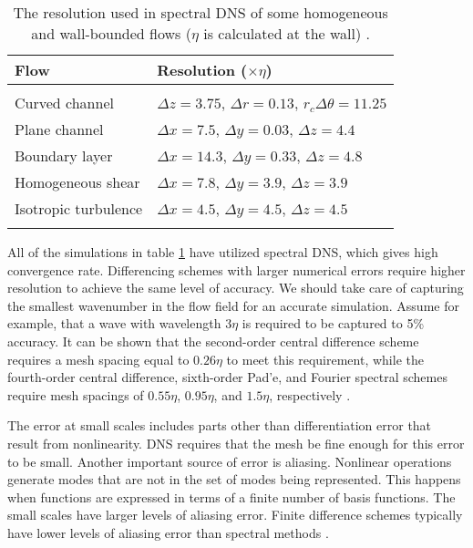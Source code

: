 \documentclass[12pt,oneside,a4paper,english]{article}
\begin{document}
\begin{table}[ht]
    \centering
    \caption[The resolution used in spectral DNS of some homogeneous and wall-bounded flows]{The resolution used in spectral DNS of some homogeneous and wall-bounded flows ($\eta$ is calculated at the wall) \cite{Kardashian1998}.}
    \label{table_first_11}
    \begin{tabular}{ll}
    \hline
    Flow & Resolution ($\times \eta$) \\
    \hline \hline \\
    Curved channel & $\Delta z = 3.75$, $\Delta r = 0.13$, $r_c \Delta \theta = 11.25$ \\
    Plane channel & $\Delta x = 7.5$, $\Delta y = 0.03$, $\Delta z = 4.4$ \\
    Boundary layer & $\Delta x = 14.3$, $\Delta y = 0.33$, $\Delta z = 4.8$ \\
    Homogeneous shear & $\Delta x = 7.8$, $\Delta y = 3.9$, $\Delta z = 3.9$ \\
    Isotropic turbulence & $\Delta x = 4.5$, $\Delta y = 4.5$, $\Delta z = 4.5$ \\
    \hline \\
\end{tabular}
\end{table}

All of the simulations in table \ref{table_first_11} have utilized spectral DNS, which gives high convergence rate. Differencing schemes with larger numerical errors require higher resolution to achieve the same level of accuracy. We should take care of capturing the smallest wavenumber in the flow field for an accurate simulation. Assume for example, that a wave with wavelength $3\eta$ is required to be captured to 5\% accuracy. It can be shown that the second-order central difference scheme requires a mesh spacing equal to $0.26\eta$ to meet this requirement, while the fourth-order central difference, sixth-order Pad'e, and Fourier spectral schemes require mesh spacings of $0.55\eta$, $0.95\eta$, and $1.5\eta$, respectively \cite{Kardashian1998}.

The error at small scales includes parts other than differentiation error that result from nonlinearity. DNS requires that the mesh be fine enough for this error to be small. Another important source of error is aliasing. Nonlinear operations generate modes that are not in the set of modes being represented. This happens when functions are expressed in terms of a finite number of basis functions. The small scales have larger levels of aliasing error. Finite difference schemes typically have lower levels of aliasing error than spectral methods \cite{Kardashian1998}.
\end{document}
